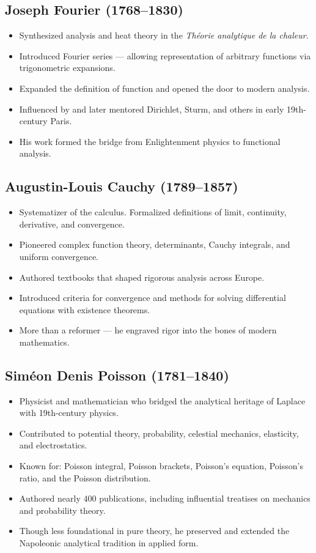 \documentclass[9pt]{article}
\begin{document}
\subsection*{Joseph Fourier (1768–1830)}
\begin{itemize}
  \item Synthesized analysis and heat theory in the \textit{Théorie analytique de la chaleur}.
  \item Introduced Fourier series — allowing representation of arbitrary functions via trigonometric expansions.
  \item Expanded the definition of function and opened the door to modern analysis.
  \item Influenced by and later mentored Dirichlet, Sturm, and others in early 19th-century Paris.
  \item His work formed the bridge from Enlightenment physics to functional analysis.
\end{itemize}

\subsection*{Augustin-Louis Cauchy (1789–1857)}
\begin{itemize}
  \item Systematizer of the calculus. Formalized definitions of limit, continuity, derivative, and convergence.
  \item Pioneered complex function theory, determinants, Cauchy integrals, and uniform convergence.
  \item Authored textbooks that shaped rigorous analysis across Europe.
  \item Introduced criteria for convergence and methods for solving differential equations with existence theorems.
  \item More than a reformer — he engraved rigor into the bones of modern mathematics.
\end{itemize}

\subsection*{Siméon Denis Poisson (1781–1840)}
\begin{itemize}
  \item Physicist and mathematician who bridged the analytical heritage of Laplace with 19th-century physics.
  \item Contributed to potential theory, probability, celestial mechanics, elasticity, and electrostatics.
  \item Known for: Poisson integral, Poisson brackets, Poisson’s equation, Poisson’s ratio, and the Poisson distribution.
  \item Authored nearly 400 publications, including influential treatises on mechanics and probability theory.
  \item Though less foundational in pure theory, he preserved and extended the Napoleonic analytical tradition in applied form.
\end{itemize}
\end{document}
